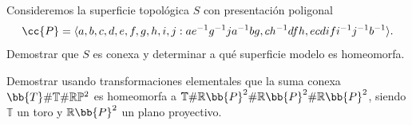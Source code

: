 \documentclass[12pt]{article}
\begin{document}
    \begin{ejercicio}[1.5 puntos]
        Consideremos la superficie topológica $S$ con presentación poligonal
        \begin{equation*}
            \cc{P} = \langle a,b,c,d,e,f,g,h,i,j:ae^{-1}g^{-1}ja^{-1}bg,ch^{-1}dfh,ecdifi^{-1}j^{-1}b^{-1} \rangle .
        \end{equation*}
        Demostrar que $S$ es conexa y determinar a qué superficie modelo es homeomorfa.
    \end{ejercicio}
        
    \begin{ejercicio}
        Demostrar usando transformaciones elementales que la suma conexa $\bb{T}\# \mathbb{T} \# \mathbb{R}\mathbb{P}^2$ es homeomorfa a $\mathbb{T}\# \mathbb{R}\bb{P}^2\# \mathbb{R}\bb{P}^2\# \mathbb{R}\bb{P}^2$, siendo $\mathbb{T}$ un toro y $\mathbb{R}\bb{P}^2$ un plano proyectivo.
    \end{ejercicio}
\end{document}
